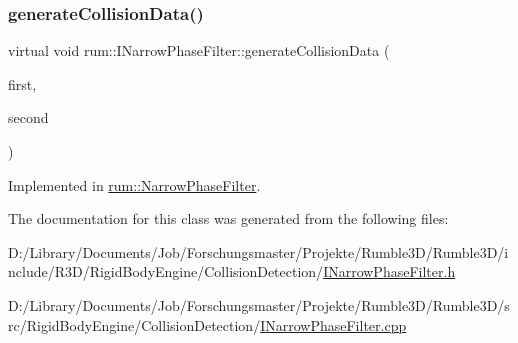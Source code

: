 \mbox{\label{classrum_1_1_i_narrow_phase_filter_a24ed990b049a4912fdebe0dd395d018b}} 
\subsubsection{\texorpdfstring{generate\+Collision\+Data()}{generateCollisionData()}\hspace{0.1cm}{\footnotesize\ttfamily [5/5]}}
{\footnotesize\ttfamily virtual void rum\+::\+I\+Narrow\+Phase\+Filter\+::generate\+Collision\+Data (\begin{DoxyParamCaption}\item[{\mbox{\hyperlink{classrum_1_1_collision_sphere}{Collision\+Sphere}} $\ast$}]{first,  }\item[{\mbox{\hyperlink{classrum_1_1_collision_sphere}{Collision\+Sphere}} $\ast$}]{second }\end{DoxyParamCaption})\hspace{0.3cm}{\ttfamily [pure virtual]}}



Implemented in \mbox{\hyperlink{classrum_1_1_narrow_phase_filter_a5cc42b7f9ce3866d5e837d95fe3f1592}{rum\+::\+Narrow\+Phase\+Filter}}.



The documentation for this class was generated from the following files\+:\begin{DoxyCompactItemize}
\item 
D\+:/\+Library/\+Documents/\+Job/\+Forschungsmaster/\+Projekte/\+Rumble3\+D/\+Rumble3\+D/include/\+R3\+D/\+Rigid\+Body\+Engine/\+Collision\+Detection/\mbox{\hyperlink{_i_narrow_phase_filter_8h}{I\+Narrow\+Phase\+Filter.\+h}}\item 
D\+:/\+Library/\+Documents/\+Job/\+Forschungsmaster/\+Projekte/\+Rumble3\+D/\+Rumble3\+D/src/\+Rigid\+Body\+Engine/\+Collision\+Detection/\mbox{\hyperlink{_i_narrow_phase_filter_8cpp}{I\+Narrow\+Phase\+Filter.\+cpp}}\end{DoxyCompactItemize}
